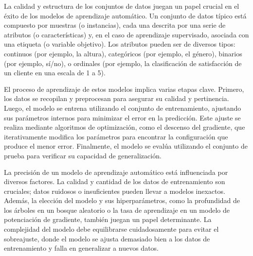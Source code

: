 La calidad y estructura de los conjuntos de datos juegan un papel crucial en el éxito de los modelos de aprendizaje automático. Un conjunto de datos típico está compuesto por muestras (o instancias), cada una descrita por una serie de atributos (o características) y, en el caso de aprendizaje supervisado, asociada con una etiqueta (o variable objetivo). Los atributos pueden ser de diversos tipos: continuos (por ejemplo, la altura), categóricos (por ejemplo, el género), binarios (por ejemplo, sí/no), o ordinales (por ejemplo, la clasificación de satisfacción de un cliente en una escala de 1 a 5).

El proceso de aprendizaje de estos modelos implica varias etapas clave. Primero, los datos se recopilan y preprocesan para asegurar su calidad y pertinencia. Luego, el modelo se entrena utilizando el conjunto de entrenamiento, ajustando sus parámetros internos para minimizar el error en la predicción. Este ajuste se realiza mediante algoritmos de optimización, como el descenso del gradiente, que iterativamente modifica los parámetros para encontrar la configuración que produce el menor error. Finalmente, el modelo se evalúa utilizando el conjunto de prueba para verificar su capacidad de generalización.

La precisión de un modelo de aprendizaje automático está influenciada por diversos factores. La calidad y cantidad de los datos de entrenamiento son cruciales; datos ruidosos o insuficientes pueden llevar a modelos inexactos. Además, la elección del modelo y sus hiperparámetros, como la profundidad de los árboles en un bosque aleatorio o la tasa de aprendizaje en un modelo de potenciación de gradiente, también juegan un papel determinante. La complejidad del modelo debe equilibrarse cuidadosamente para evitar el sobreajuste, donde el modelo se ajusta demasiado bien a los datos de entrenamiento y falla en generalizar a nuevos datos.

